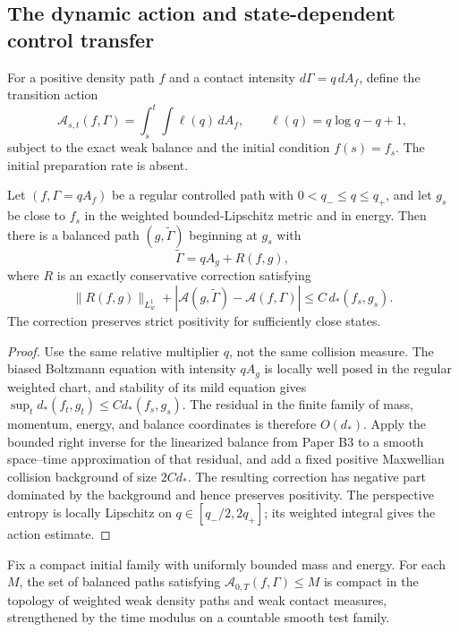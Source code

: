 \subsection{The dynamic action and state-dependent control transfer}

For a positive density path $f$ and a contact intensity
$d\Gamma=q\,dA_f$, define the transition action
\[
 \mathcal A_{s,t}(f,\Gamma)
 =\int_s^t\int\ell(q)\,dA_f,
 \qquad \ell(q)=q\log q-q+1,
\]
subject to the exact weak balance and the initial condition $f(s)=f_s$.  The
initial preparation rate is absent.

\begin{lemma}
\label{lem:r17-b4-transfer}
Let $(f,\Gamma=qA_f)$ be a regular controlled path with
$0<q_-\le q\le q_+$, and let $g_s$ be close to $f_s$ in the weighted
bounded-Lipschitz metric and in energy.  Then there is a balanced path
$(g,\widetilde\Gamma)$ beginning at $g_s$ with
\[
 \widetilde\Gamma=qA_g+R(f,g),
\]
where $R$ is an exactly conservative correction satisfying
\[
 \|R(f,g)\|_{L^1_w}
 +|\mathcal A(g,\widetilde\Gamma)-
   \mathcal A(f,\Gamma)|
 \le C\,d_*(f_s,g_s).
\]
The correction preserves strict positivity for sufficiently close states.
\end{lemma}

\begin{proof}
Use the same relative multiplier $q$, not the same collision measure.  The
biased Boltzmann equation with intensity $qA_g$ is locally well posed in the
regular weighted chart, and stability of its mild equation gives
$\sup_t d_*(f_t,g_t)\le C d_*(f_s,g_s)$.  The residual in the finite family of
mass, momentum, energy, and balance coordinates is therefore $O(d_*)$.  Apply
the bounded right inverse for the linearized balance from Paper B3 to a smooth
space--time approximation of that residual, and add a fixed positive
Maxwellian collision background of size $2C d_*$.  The resulting correction
has negative part dominated by the background and hence preserves positivity.
The perspective entropy is locally Lipschitz on
$q\in[q_-/2,2q_+]$; its weighted integral gives the action estimate.
\end{proof}

\begin{lemma}
\label{lem:r17-b4-compact}
Fix a compact initial family with uniformly bounded mass and energy.  For each
$M$, the set of balanced paths satisfying
$\mathcal A_{0,T}(f,\Gamma)\le M$ is compact in the topology of weighted
weak density paths and weak contact measures, strengthened by the time
modulus on a countable smooth test family.
\end{lemma}

